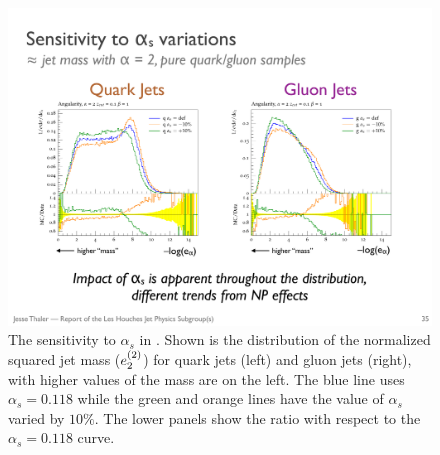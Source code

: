 \begin{figure}[t]
\begin{center}
\includegraphics[width = 0.99\columnwidth]{figures/sensitivity.pdf}
\end{center}
\caption{  The sensitivity to $\alpha_s$ in \herwig.  Shown is the distribution of the normalized squared jet mass ($e_{2}^{(2)}$) for quark jets (left) and gluon jets (right), with higher values of the mass are on the left.  The blue line uses $\alpha_s=0.118$ while the green and orange lines have the value of $\alpha_s$ varied by $10\%$.  The lower panels show the ratio with respect to the $\alpha_s=0.118$ curve.}
\label{fig:sensitivity}
\end{figure}

